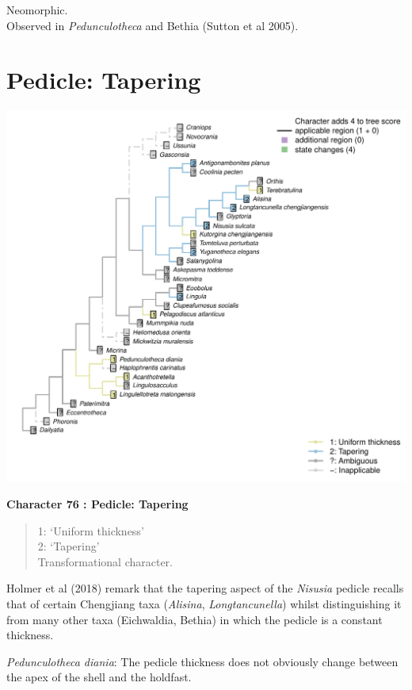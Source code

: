 \documentclass[]{book}
\theoremstyle{definition}
\theoremstyle{definition}
\theoremstyle{definition}
\theoremstyle{remark}
\begin{document}
Neomorphic.\\
Observed in \emph{Pedunculotheca} and Bethia (Sutton et al 2005).

\hypertarget{pedicle-tapering}{%
\section*{Pedicle: Tapering}\label{pedicle-tapering}}

\includegraphics{Brachiopod_phylogeny_files/figure-latex/unnamed-chunk-5-76.pdf}

\textbf{Character 76 : Pedicle: Tapering }

\begin{quote}
1: `Uniform thickness'\\
2: `Tapering'\\
Transformational character.
\end{quote}

Holmer et al (2018) remark that the tapering aspect of the
\emph{Nisusia} pedicle recalls that of certain Chengjiang taxa
(\emph{Alisina}, \emph{Longtancunella}) whilst distinguishing it from
many other taxa (Eichwaldia, Bethia) in which the pedicle is a constant
thickness.

\emph{Pedunculotheca diania}: The pedicle thickness does not obviously
change between the apex of the shell and the holdfast.
\end{document}
